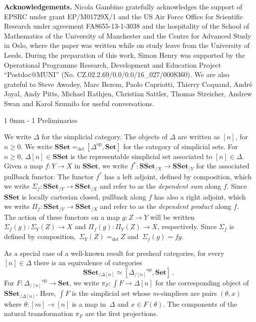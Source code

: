 \documentclass[reqno,10pt,a4paper,oneside]{amsart}
\makeatletter
\renewcommand{\section}{\@startsection
{section}%
{1}%
{0mm}%
{-\baselineskip}%
{1\baselineskip}%
{\Large \bfseries}}%
\numberwithin{equation}{section}
\theoremstyle{mythm}
\theoremstyle{mydef}
\theoremstyle{myrmk}
\newcommand{\defeq}{=_{\operatorname{def}}}
\newcommand{\co}{\colon}
\newcommand{\op}{\operatorname{op}}
\newcommand{\SSet}{\mathbf{SSet}}
\newcommand{\Set}{\mathbf{Set}}
\makeatother
\begin{document}
\smallskip

\noindent 
\textbf{Acknowledgements.} Nicola Gambino gratefully acknowledges the support of
EPSRC under grant EP/M01729X/1 and the US Air Force Office for Scientific Research under 
agreement FA8655-13-1-3038 and the hospitality of the 
School of Mathematics of the University of Manchester and the Centre for Advanced Study in Oslo,
where the paper was written while on study leave from the University of Leeds. During the preparation of this work, Simon Henry was supported by the Operational Programme Research, Development and Education Project ``Postdoc@MUNI'' (No. CZ.02.2.69/0.0/0.0/16\_027/0008360). We are also grateful to Steve Awodey, Marc Bezem, Paolo Capriotti, Thierry Coquand, Andr\'e Joyal, Andy Pitts, Michael Rathjen, Christian Sattler, Thomas Streicher, Andrew Swan and Karol Szumi{\l}o  for useful conversations. 






\section{Preliminaries} 
\label{sec:preliminaries}




We write $\Delta$ for the simplicial category. The objects of $\Delta$ are written as $[n]$, for $n \geq 0$.
We write $\SSet \defeq [\Delta^{\op}, \Set]$ for the category of simplicial sets. For $n \geq 0$, $\Delta[n] \in \SSet$ is the representable simplicial set associated to $[n] \in \Delta$. Given a map $f \co Y \to X$ in $\SSet$, we write $f^* \co \SSet_{/X} \to \SSet_{/Y}$
for the associated pullback functor. The functor $f^*$ has a left adjoint, defined
by composition, which we write $\Sigma_{f} \co \SSet_{/Y} \to \SSet_{/X}$ and refer
to as the \emph{dependent sum} along $f$. Since $\SSet$ is locally cartesian closed, pullback
along $f$ has also a right adjoint, which we write 
$\Pi_f \co \SSet_{/Y} \to \SSet_{/X}$ and refer to as the \emph{dependent
product}  along $f$. The action of these functors on a
map $g \co Z \to Y$ will be written $\Sigma_f(g) \co \Sigma_Y(Z) \to X$ and 
$\Pi_f(g) \co \Pi_Y(Z) \to X$, respectively. Since  $\Sigma_f$ is defined by composition,~$\Sigma_Y(Z) \defeq Z$ and~$\Sigma_f(g) = fg $. 

As a special case of a well-known result for presheaf 
categories,  for every~$[n] \in \Delta$ there is an equivalence of categories
\begin{equation}
\label{equ:psh-slice-sset}
\SSet_{/\Delta[n]} \simeq  [ {\Delta_{/[n]}}^{\op}, \Set]   \, .
\end{equation}
For $F \co {\Delta_{/[n]}}^{\op} \to \Set$, we write $\pi_F \co \int F \to \Delta[n]$
for the corresponding object of~$\SSet_{/ \Delta[n]}$. Here, $\int F$ is the
simplicial set whose $m$-simplices are pairs $(\theta, x)$ where $\theta \co [m] \to [n]$
is a map in~$\Delta$ and $x \in F(\theta)$. The components of the natural
transformation $\pi_F$ are the first projections.
\end{document}
